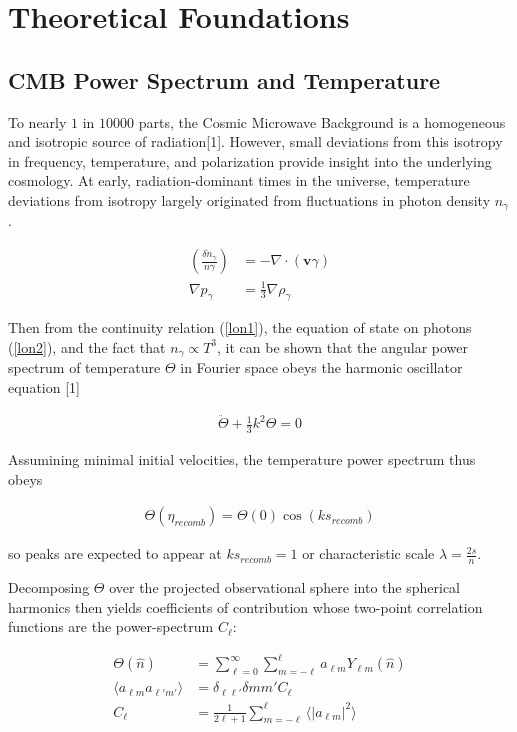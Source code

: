 \documentclass[aps,prd,final,twocolumn]{revtex4}
\begin{document}
\section{Theoretical Foundations \label{sec:theory} }
\subsection{CMB Power Spectrum and Temperature}
To nearly $1$ in $10000$ parts, the Cosmic Microwave Background is a homogeneous and isotropic source of radiation[1]. However, small deviations from this isotropy in frequency, temperature, and polarization provide insight into the underlying cosmology. At early, radiation-dominant times in the universe, temperature deviations from isotropy largely originated from fluctuations in photon density $n_\gamma$. 

\begin{align}
\left(\frac{\delta\dot{n}_\gamma}{n\gamma}\right) &=-\nabla\cdot(\mathbf{v}\gamma)\label{lon1}\\
\nabla p_\gamma &= \frac{1}{3}\nabla \rho_\gamma\label{lon2}
\end{align}

Then from the continuity relation (\ref{lon1}), the equation of state on photons (\ref{lon2}), and the fact that $n_\gamma\propto T^3$, it can be shown that the angular power spectrum of temperature $\Theta$ in Fourier space obeys the harmonic oscillator equation [1]

\begin{align}
\ddot{\Theta}+\frac{1}{3}k^2\Theta = 0\label{lon3}
\end{align}

Assumining minimal initial velocities, the temperature power spectrum thus obeys

\begin{align}
\Theta(\eta_{recomb}) = \Theta(0)\cos(ks_{recomb})\label{lon4}
\end{align}

so peaks are expected to appear at $ks_{recomb}=1$ or characteristic scale $\lambda = \frac{2s}{n}$.

Decomposing $\Theta$ over the projected observational sphere into the spherical harmonics then yields coefficients of contribution whose two-point correlation functions are the power-spectrum $C_\ell$:

\begin{align}
\Theta(\hat{n}) &= \sum_{\ell=0}^\infty \sum_{m=-\ell}^{\ell} a_{\ell m}Y_{\ell m}(\hat{n}) \label{lon5}\\
\langle a_{\ell m} a_{\ell' m'}\rangle &= \delta_{\ell \ell'}\delta{m m'}C_{\ell}\\
C_{\ell} &= \frac{1}{2\ell+1}\sum_{m=-\ell}^\ell \langle |a_{\ell m}|^2\rangle \label{lon 7}
\end{align}
\end{document}
